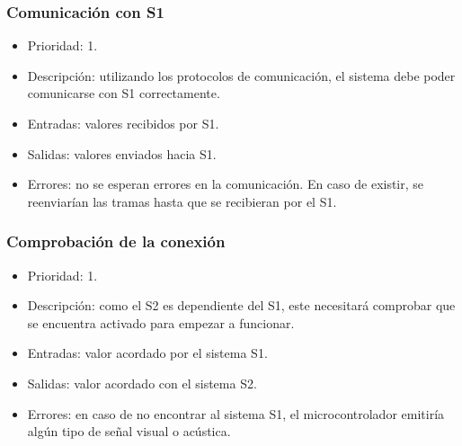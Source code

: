 \subsubsection{Comunicación con \ac{S1}}
\begin{itemize}
    \item Prioridad: 1.
    \item Descripción: utilizando los protocolos de comunicación, el sistema debe poder comunicarse con \ac{S1} correctamente.
    \item Entradas: valores recibidos por \ac{S1}.
    \item Salidas: valores enviados hacia \ac{S1}.
    \item Errores: no se esperan errores en la comunicación. En caso de existir, se reenviarían las tramas hasta que se recibieran por el \ac{S1}.
\end{itemize}

\subsubsection{Comprobación de la conexión}
\begin{itemize}
    \item Prioridad: 1.
    \item Descripción: como el \ac{S2} es dependiente del \ac{S1}, este necesitará comprobar que se encuentra activado para empezar a funcionar.
    \item Entradas: valor acordado por el sistema \ac{S1}.
    \item Salidas: valor acordado con el sistema \ac{S2}.
    \item Errores: en caso de no encontrar al sistema \ac{S1}, el microcontrolador emitiría algún tipo de señal visual o acústica.
\end{itemize}